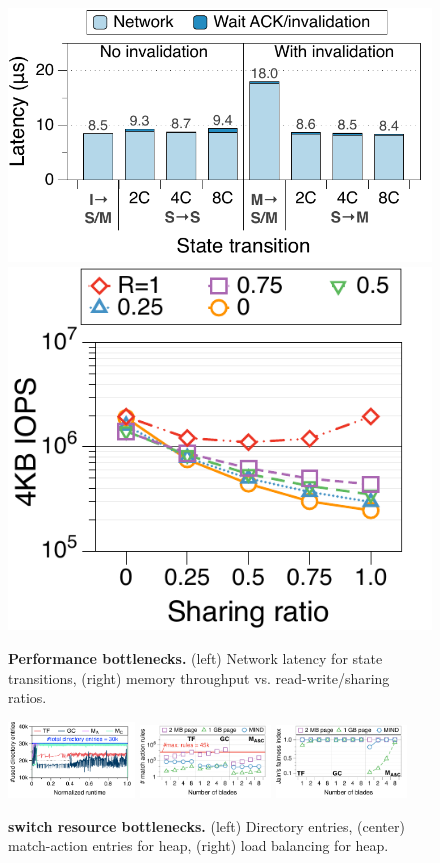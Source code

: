 \begin{figure}[t!]
  \centering
  \includegraphics[width=0.58\linewidth]{fig/mind/15_transition_latency}\hfill
  \includegraphics[width=0.40\linewidth]{fig/mind/16_sharing_ratio}
  \vspace{-0.9em}
  \caption[Performance bottlenecks]{\textbf{Performance bottlenecks.} (left) Network latency for state transitions, (right) memory throughput vs. read-write/sharing ratios.}
  \label{fig:micro_latency}
  \label{fig:micro_band} 
  \label{fig:perfbottlenecks}
\end{figure}

\begin{figure}[ht!]
  \centering
  \includegraphics[width=0.3\textwidth]{fig/mind/09_switch_entries_over_time}\hspace{1em}
  \includegraphics[width=0.31\textwidth]{fig/mind/12_micro_num_entry}\hspace{1em}
  \includegraphics[width=0.31\textwidth]{fig/mind/12_micro_load_balance}
  \vspace{-0.9em}
  \caption[\mind switch resource bottlenecks]{\textbf{\mind switch resource bottlenecks.} (left) Directory entries, (center) match-action entries for heap, (right) load balancing for heap.}
  \label{fig:resbottlenecks}
  \label{fig:micro_load_balance}
  \label{fig:micro_num_entry}
  \label{fig:macro_cache_dir}
\end{figure}

